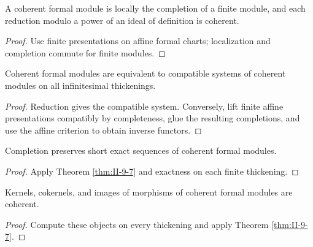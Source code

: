 \begin{proposition}
\label{prop:II-9-6}
A coherent formal module is locally the completion of a finite module, and each reduction modulo a
power of an ideal of definition is coherent.
\end{proposition}
\begin{proof}
Use finite presentations on affine formal charts; localization and completion commute for finite modules.
\end{proof}

\begin{theorem}
\label{thm:II-9-7}
Coherent formal modules are equivalent to compatible systems of coherent modules on all infinitesimal
thickenings.
\end{theorem}
\begin{proof}
Reduction gives the compatible system. Conversely, lift finite affine presentations compatibly by
completeness, glue the resulting completions, and use the affine criterion to obtain inverse functors.
\end{proof}

\begin{corollary}
\label{cor:II-9-8}
Completion preserves short exact sequences of coherent formal modules.
\end{corollary}
\begin{proof}
Apply Theorem \ref{thm:II-9-7} and exactness on each finite thickening.
\end{proof}

\begin{corollary}
\label{cor:II-9-9}
Kernels, cokernels, and images of morphisms of coherent formal modules are coherent.
\end{corollary}
\begin{proof}
Compute these objects on every thickening and apply Theorem \ref{thm:II-9-7}.
\end{proof}
